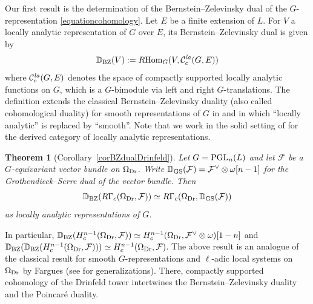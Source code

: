 \documentclass[a4paper,10pt]{amsart}
\newtheorem{theorem}{Theorem}[section]
\theoremstyle{remark}
\theoremstyle{definition}
\theoremstyle{plain}
\numberwithin{equation}{section}
\newcommand{\bbD}{{\mathbb D}}
\newcommand{\calC}{{\mathcal C}}
\newcommand{\calF}{{\mathcal F}}
\newcommand{\Hom}{{\rm Hom}}
\newcommand{\la}{{\it la}}
\newcommand{\PGL}{{\rm PGL}}
\newcommand{\BZ}{\ensuremath{\mathrm{BZ}}}
\begin{document}
Our first result is the determination of the Bernstein--Zelevinsky dual of the $G$-representation \eqref{equationcohomology}. Let $E$ be a finite extension of $L$. For $V$ a locally analytic representation of $G$ over $E$, its Bernstein--Zelevinsky dual is given by \cite[Def.~5.4]{strauch2025bernsteinzelevinskydualitylocallyanalytic}
\begin{equation}\label{equationdefinitiondual}
	\bbD_{\BZ}(V):=R\Hom_G(V,\calC_c^{\la}(G,E))
\end{equation}
where $\calC_c^{\la}(G,E)$ denotes the space of compactly supported locally analytic functions on $G$, which is a $G$-bimodule via left and right $G$-translations. The definition extends the classical Bernstein--Zelevinsky duality (also called cohomological duality) for smooth representations of $G$ in \cite[IV.5]{bernstein1992notes} and \cite{Farguesdualite} in which ``locally analytic'' is replaced by ``smooth''. Note that we work in the solid setting of \cite{rodrigues2022solid,JC23} for the derived category of locally analytic representations.
\begin{theorem}[{Corollary~\ref{corBZdualDrinfeld}}]\label{theoremintroBZdual}
    Let $G=\PGL_n(L)$ and let $\calF$ be a $G$-equivariant vector bundle on $\Omega_{\rm Dr}$. Write $\bbD_{\rm GS}(\calF)=\calF^{\vee}\otimes \omega[n-1]$ for the Grothendieck--Serre dual of the vector bundle. Then 
    \[\bbD_{\BZ}(R\Gamma_c(\Omega_{\rm Dr},\calF))\simeq R\Gamma_c(\Omega_{\rm Dr},\bbD_{\rm GS}(\calF))\] 
    as locally analytic representations of $G$.
\end{theorem}
In particular, $\bbD_{\BZ}(H^{n-1}_c(\Omega_{\rm Dr},\calF))\simeq H^{n-1}_c(\Omega_{\rm Dr},\calF^{\vee}\otimes \omega)[1-n]$ and $\bbD_{\BZ}(\bbD_{\BZ}(H^{n-1}_c(\Omega_{\rm Dr},\calF)))\simeq H^{n-1}_c(\Omega_{\rm Dr},\calF)$. The above result is an analogue of the classical result for smooth $G$-representations and $\ell$-adic local systems on $\Omega_{\rm Dr}$ by Fargues \cite{Farguesdualite} (see \cite{mieda2014zelevinsky, hamann2021zelevinsky} for generalizations). There, compactly supported cohomology of the Drinfeld tower intertwines the Bernstein--Zelevinsky duality and the Poincar\'e duality.
\end{document}

